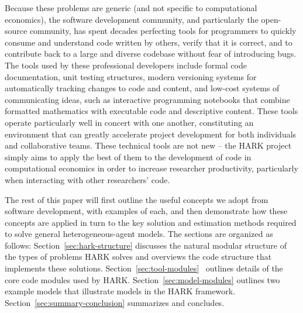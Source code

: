 \message{ !name(ccarroll_et_al_scipy_2018.tex)}\documentclass[10pt,twocolumn]{article}
\begin{document}
Because these problems are generic (and not specific to computational economics), the software development community, and particularly the open-source community, has spent decades perfecting tools for programmers to quickly consume and understand code written by others, verify that it is correct, and to contribute back to a large and diverse codebase without fear of introducing bugs. The tools used by these professional developers include formal code documentation, unit testing structures, modern versioning systems for automatically tracking changes to code and content, and low-cost systems of communicating ideas, such as interactive programming notebooks that combine formatted mathematics with executable code and descriptive content. These tools operate particularly well in concert with one another, constituting an environment that can greatly accelerate project development for both individuals and collaborative teams. These technical tools are not new -- the HARK project simply aims to apply the best of them to the development of code in computational economics in order to increase researcher productivity, particularly when interacting with other researchers' code.



The rest of this paper will first outline the useful concepts we adopt from software development, with examples of each, and then demonstrate how these concepts are applied in turn to the key solution and estimation methods required to solve general heterogeneous-agent models.  The sections are organized as follows:
\mbox{Section \ref{sec:hark-structure}} discusses the natural modular
structure of the types of problems HARK solves and overviews the code
structure that implements these solutions.
\mbox{Section \ref{sec:tool-modules} } outlines details of the core code
modules used by HARK. \mbox{Section \ref{sec:model-modules}} outlines
two example models that illustrate models in the HARK framework.
\mbox{Section \ref{sec:summary-conclusion}} summarizes and
concludes.
\end{document}
